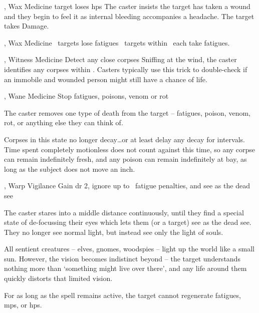   {\mFate, \mAir}%
  {Wax}%
  {\detailed}%
  {Medicine}%
  {target loses  \glspl{hp}}%
  {
    The caster insists the target has taken a wound and they begin to feel it as internal bleeding accompanies a headache.
    The target takes  Damage.
  }

  {\mFate, \mAir}%
  {Wax}%
  {\duplicated}%
  {Medicine}%
  {\spellArea\ targets lose  \glspl{fatigue}}%
  {
    \spellArea\ targets within \spellRange\ each take  \glspl{fatigue}.
  }

  {\mFate, \mAir}%
  {Witness}%
  {\distant}%
  {Medicine}%
  {Detect any close corpses}%
  {
    Sniffing at the wind, the caster identifies any corpses within \spellRange.
    Casters typically use this trick to double-check if an immobile and wounded person might still have a chance of life.
  }

  {\mFate, \mAir}%
  {Wane}%
  {\detailed}%
  {Medicine}%
  {Stop \glspl{fatigue}, poisons, venom or rot}%
  {
    The caster removes one type of death from the target -- \glspl{fatigue}, poison, venom, rot, or anything else they can think of.

    Corpses in this state no longer decay\ldots or at least delay any decay for  \glspl{interval}. 
    Time spent completely motionless does not count against this time, so any corpse can remain indefinitely fresh, and any poison can remain indefinitely at bay, as long as the subject does not move an inch.
  }

  {\mFate, \mAir}%
  {Warp}%
  {\detailed}%
  {Vigilance}%
  {Gain \gls{dr} 2, ignore up to ~\gls{fatigue} penalties, and see as the dead see}%
  {
    The caster stares into a middle distance continuously, until they find a special state of de-focussing their eyes which lets them (or a target) see as the dead see.
    They no longer see normal light, but instead see only the light of souls.

    All sentient creatures -- elves, gnomes, woodspies -- light up the world like a small sun.
    However, the vision becomes indistinct beyond \spellRange -- the target understands nothing more than `something might live over there', and any life around them quickly distorts that limited vision.

    For as long as the spell remains active, the target cannot regenerate \glspl{fatigue}, \glspl{mp}, or \glspl{hp}.
  }

